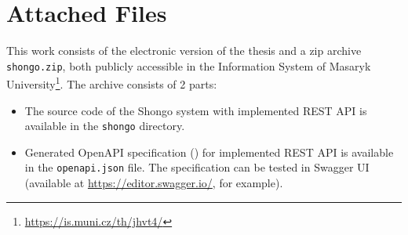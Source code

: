 \chapter{Attached Files} \label{apx:files}
This work consists of the electronic version of the thesis and a zip archive \texttt{shongo.zip}, both publicly accessible in the Information System of Masaryk University\footnote{\url{https://is.muni.cz/th/jhvt4/}}.
The archive consists of 2 parts:
\begin{itemize}
    \item The source code of the Shongo system with implemented REST API is available in the \texttt{shongo} directory.
    \item Generated OpenAPI specification () for implemented REST API is available in the \texttt{openapi.json} file. The specification can be tested in Swagger UI (available at \url{https://editor.swagger.io/}, for example).
\end{itemize}
